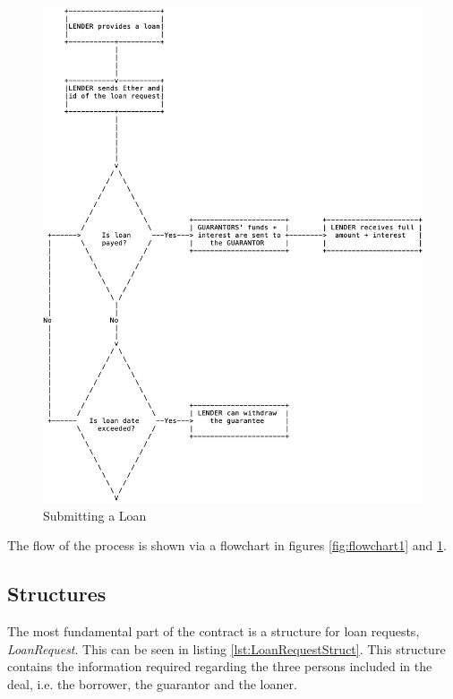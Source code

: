 \documentclass[a4paper, 12pt]{article}
\begin{document}
\begin{figure}[h!]
	\centering
	\includegraphics[width=\textwidth]{./Diagrams/problem1-flowchart2}
	\caption{Submitting a Loan}
	\label{fig:flowchart2}
\end{figure}

The flow of the process is shown via a flowchart in figures \ref{fig:flowchart1} and \ref{fig:flowchart2}.


\subsection{Structures}

The most fundamental part of the contract is a structure for loan requests, \textit{LoanRequest}. 
This can be seen in listing \ref{lst:LoanRequestStruct}. This structure contains the information required regarding the three persons included in the deal, i.e. the borrower, the guarantor and the loaner.
\end{document}

